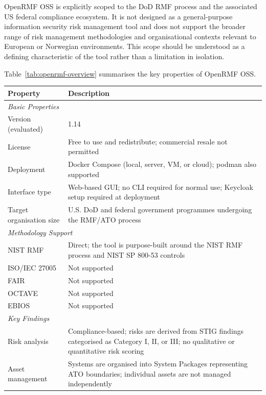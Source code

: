 OpenRMF OSS is explicitly scoped to the DoD RMF process and the associated US
federal compliance ecosystem. It is not designed as a general-purpose information
security risk management tool and does not support the broader range of risk
management methodologies and organisational contexts relevant to European or
Norwegian environments. This scope should be understood as a defining
characteristic of the tool rather than a limitation in isolation.
 
Table~\ref{tab:openrmf-overview} summarises the key properties of OpenRMF OSS.
 
\begin{table}[H]
\centering
\renewcommand{\arraystretch}{1.3}
\begin{tabular}{|p{4.5cm}|p{9cm}|}
\hline
\textbf{Property} & \textbf{Description} \\
\hline
\multicolumn{2}{|l|}{\textit{Basic Properties}} \\
\hline
Version (evaluated) & 1.14 \\
\hline
License & Free to use and redistribute; commercial resale not permitted \\
\hline
Deployment & Docker Compose (local, server, VM, or cloud); podman also supported \\
\hline
Interface type & Web-based GUI; no CLI required for normal use; Keycloak setup required at deployment \\
\hline
Target organisation size & U.S. DoD and federal government programmes undergoing the RMF/ATO process \\
\hline
\multicolumn{2}{|l|}{\textit{Methodology Support}} \\
\hline
NIST RMF & Direct; the tool is purpose-built around the NIST RMF process and NIST SP 800-53 controls \\
\hline
ISO/IEC 27005 & Not supported \\
\hline
FAIR & Not supported \\
\hline
OCTAVE & Not supported \\
\hline
EBIOS & Not supported \\
\hline
\multicolumn{2}{|l|}{\textit{Key Findings}} \\
\hline
Risk analysis & Compliance-based; risks are derived from STIG findings categorised as Category I, II, or III; no qualitative or quantitative risk scoring \\
\hline
Asset management & Systems are organised into System Packages representing ATO boundaries; individual assets are not managed independently \\

\end{tabular}
\end{table}
